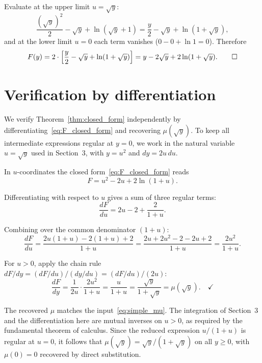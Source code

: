 \documentclass[11pt]{article}
\begin{document}
Evaluate at the upper limit $u = \sqrt{y}$:
\begin{equation}
  \frac{(\sqrt{y})^2}{2} - \sqrt{y} + \ln(\sqrt{y} + 1)
  = \frac{y}{2} - \sqrt{y} + \ln(1 + \sqrt{y}),
\end{equation}
and at the lower limit $u = 0$ each term vanishes
($0 - 0 + \ln 1 = 0$). Therefore
\begin{equation}
  F(y) = 2 \cdot \left[\frac{y}{2} - \sqrt{y} + \ln(1 + \sqrt{y})\right]
       = y - 2\sqrt{y} + 2\ln(1 + \sqrt{y}). \qed
\end{equation}

\section{Verification by differentiation}

We verify Theorem~\ref{thm:closed_form} independently by
differentiating~\eqref{eq:F_closed_form} and recovering
$\mu(\sqrt{y})$. To keep all intermediate expressions regular at
$y = 0$, we work in the natural variable $u = \sqrt{y}$ used in
Section~3, with $y = u^2$ and $dy = 2u\, du$.

In $u$-coordinates the closed form~\eqref{eq:F_closed_form} reads
\begin{equation}
  F = u^2 - 2u + 2\ln(1 + u).
\end{equation}

Differentiating with respect to $u$ gives a sum of three regular
terms:
\begin{equation}
  \frac{dF}{du} = 2u - 2 + \frac{2}{1 + u}.
\end{equation}

Combining over the common denominator $(1+u)$:
\begin{equation}
  \frac{dF}{du}
  = \frac{2u(1+u) - 2(1+u) + 2}{1+u}
  = \frac{2u + 2u^2 - 2 - 2u + 2}{1+u}
  = \frac{2u^2}{1+u}.
\end{equation}

For $u > 0$, apply the chain rule
$dF/dy = (dF/du)/(dy/du) = (dF/du)/(2u)$:
\begin{equation}
  \frac{dF}{dy}
  = \frac{1}{2u} \cdot \frac{2u^2}{1+u}
  = \frac{u}{1+u}
  = \frac{\sqrt{y}}{1 + \sqrt{y}}
  = \mu(\sqrt{y}). \quad \checkmark
\end{equation}

The recovered $\mu$ matches the input~\eqref{eq:simple_mu}. The
integration of Section~3 and the differentiation here are mutual
inverses on $u > 0$, as required by the fundamental theorem of
calculus. Since the reduced expression $u/(1+u)$ is regular at
$u = 0$, it follows that $\mu(\sqrt{y}) = \sqrt{y}/(1 + \sqrt{y})$
on all $y \geq 0$, with $\mu(0) = 0$ recovered by direct
substitution.
\end{document}
